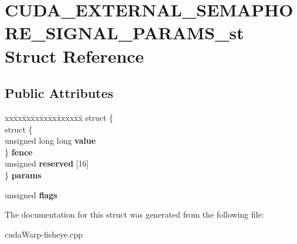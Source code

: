 \hypertarget{structCUDA__EXTERNAL__SEMAPHORE__SIGNAL__PARAMS__st}{}\section{C\+U\+D\+A\+\_\+\+E\+X\+T\+E\+R\+N\+A\+L\+\_\+\+S\+E\+M\+A\+P\+H\+O\+R\+E\+\_\+\+S\+I\+G\+N\+A\+L\+\_\+\+P\+A\+R\+A\+M\+S\+\_\+st Struct Reference}
\label{structCUDA__EXTERNAL__SEMAPHORE__SIGNAL__PARAMS__st}
\subsection*{Public Attributes}
\begin{DoxyCompactItemize}
\item 
\begin{tabbing}
xx\=xx\=xx\=xx\=xx\=xx\=xx\=xx\=xx\=\kill
struct \{\\
\>struct \{\\
\>\>unsigned long long {\bfseries value}\\
\>\} {\bfseries fence}\\
\>unsigned {\bfseries reserved} \mbox{[}16\mbox{]}\\
\} {\bfseries params}\hypertarget{structCUDA__EXTERNAL__SEMAPHORE__SIGNAL__PARAMS__st_a4b65d8690d71e012b5e069e525bc5f7d}{}\label{structCUDA__EXTERNAL__SEMAPHORE__SIGNAL__PARAMS__st_a4b65d8690d71e012b5e069e525bc5f7d}
\\

\end{tabbing}\item 
unsigned {\bfseries flags}\hypertarget{structCUDA__EXTERNAL__SEMAPHORE__SIGNAL__PARAMS__st_a1b84771dbf6d3bb44a9a53e49a7160a4}{}\label{structCUDA__EXTERNAL__SEMAPHORE__SIGNAL__PARAMS__st_a1b84771dbf6d3bb44a9a53e49a7160a4}

\end{DoxyCompactItemize}


The documentation for this struct was generated from the following file\+:\begin{DoxyCompactItemize}
\item 
cuda\+Warp-\/fisheye.\+cpp\end{DoxyCompactItemize}
